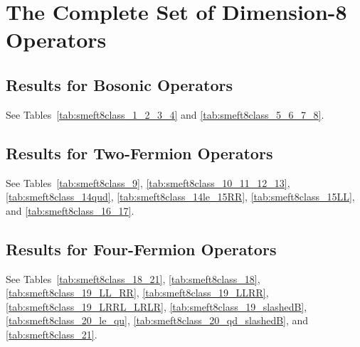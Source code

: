 \documentclass[11pt,a4paper]{article}
\begin{document}
\section{The Complete Set of Dimension-8 Operators}
\label{sec:results}



\subsection{Results for Bosonic Operators}

See Tables~\ref{tab:smeft8class_1_2_3_4} and \ref{tab:smeft8class_5_6_7_8}.





\subsection{Results for Two-Fermion Operators}

See Tables~\ref{tab:smeft8class_9}, \ref{tab:smeft8class_10_11_12_13}, \ref{tab:smeft8class_14qud}, \ref{tab:smeft8class_14le_15RR}, \ref{tab:smeft8class_15LL}, and \ref{tab:smeft8class_16_17}.











\subsection{Results for Four-Fermion Operators}

See Tables~\ref{tab:smeft8class_18_21}, \ref{tab:smeft8class_18},  \ref{tab:smeft8class_19_LL_RR}, \ref{tab:smeft8class_19_LLRR}, \ref{tab:smeft8class_19_LRRL_LRLR}, \ref{tab:smeft8class_19_slashedB}, \ref{tab:smeft8class_20_le_qu}, \ref{tab:smeft8class_20_qd_slashedB}, and \ref{tab:smeft8class_21}.
\end{document}
